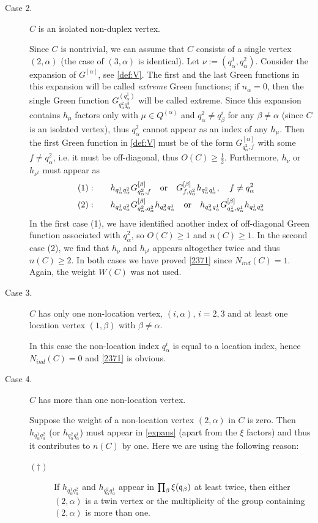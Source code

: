 \documentclass[draft]{article}
\newcommand{\fq}{{\frak q}}
\newcommand{\sa}{{[\alpha ]}}
\newcommand{\al}{\alpha}
\numberwithin{equation}{section}
\numberwithin{theorem}{section}
\numberwithin{definition}{section}
\numberwithin{remark}{section}
\begin{document}
\begin{description}
\item[ Case 2.] $C$ is  an isolated non-duplex vertex.




Since $C$ is nontrivial, we can assume that
$C$ consists of a single vertex $(2, \al)$ 
(the case  of $(3, \al)$ is identical). Let $\nu:=(q_\al^1, q_\al^2)$.
Consider the expansion 
of $G^\sa$, see \eqref{def:V}. The first and the last
Green functions in this expansion will be called {\it extreme}
Green functions; if $n_\al=0$, then the single Green function
$G^{(q_\al^1)}_{q_\al^2 q_\al^3}$ will be called extreme. 
Since this expansion contains  $h_\mu$ factors only with
$\mu\in Q^{(\al)}$ and $q_\al^2\ne q_\beta^i$ for any $\beta\ne\al$
(since $C$ is an isolated vertex),
 thus $q_\al^2$
cannot appear as an index of any $h_\mu$. Then the first Green
function in  \eqref{def:V} must be of the form  $G_{q^2_\al, f}^\sa$ with some
 $f \not = q^2_\al$, i.e. it
must be off-diagonal, thus $O(C)\ge \frac{1}{2}$.
 Furthermore, $h_\nu$ or $h_{\nu^t}$ must appear as 
\begin{align} 
(1):&     \qquad h_ {q^1_\alpha  q^2_\alpha} G^{[\beta]}_{q^2_\alpha, f} \quad \mbox{or}
\quad G^{[\beta]}_{f,  q^2_\alpha}  h_ {q^2_\alpha  q^1_\alpha},
\quad  f \not = q^2_\alpha \\
(2):&     \qquad  h_ {q^1_\alpha  q^2_\alpha} G^{[\beta]}_{q^2_\alpha, q^2_\alpha}
  h_ {q^2_\alpha  q^1_\alpha} \quad \mbox{or} \quad
   h_ {q^2_\alpha  q^1_\alpha} G^{[\beta]}_{q^1_\alpha, q^1_\alpha}
  h_ {q^1_\alpha  q^2_\alpha}
\end{align}
In the first  case (1), we have identified another  index
  of off-diagonal Green function associated with $q^2_\alpha$,
so $O(C)\ge 1$ and $n(C)\ge 1$.
In the second case (2), 
we find that $h_\nu$ and $h_{\nu^t}$ appears altogether twice 
 and thus $n(C) \ge 2 $. In both cases
 we have proved \eqref{2371} since $N_{ind}(C) = 1$. Again, the weight 
$W(C)$ was not used.


\item[Case 3.] $C$ has only one non-location vertex, $(i, \al)$, $i=2,3$ 
and at least one location vertex $(1,\beta)$ with $\beta\ne\al$.  

In this case the non-location index $q_\al^i$ is equal to a location index,
hence $N_{ind}(C)=0$ and \eqref{2371} is obvious.


\item[ Case 4.] $C$  has more than one  non-location vertex.


Suppose the weight
 of a non-location vertex  $ (2,\alpha)$ in $C$ is zero. Then 
$h_ {q^1_\alpha  q^2_\alpha}$ (or $h_ {q^2_\alpha  q^1_\alpha}$)
  must appear in \eqref{expans} (apart from the $\xi$ factors)
  and thus it contributes to $n(C)$
 by one. Here we are using the following reason: 
\begin{description}
\item[$(\dagger)$]  If  $h_ {q^1_\alpha  q^2_\alpha}$   and $h_ {q^2_\alpha  q^1_\alpha}$
  appear in  $\prod_\beta \xi(\fq_\beta)$ at least twice, 
then either  $(2,\al)$ is a twin vertex or the multiplicity of the group
 containing $(2,\al)$  is more than one. 
\end{description}


\end{description}
\end{document}
